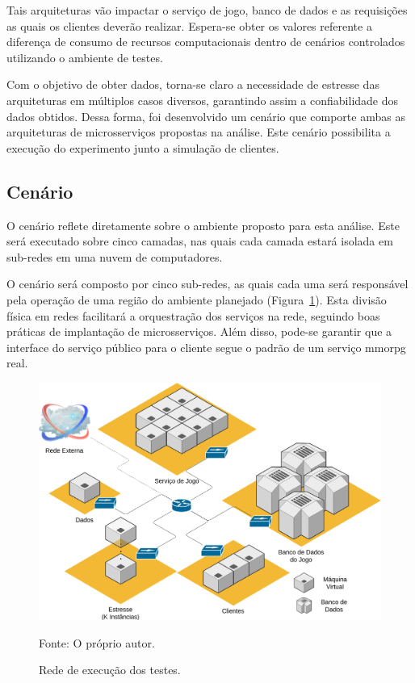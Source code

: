 Tais arquiteturas vão impactar o serviço de jogo, banco de dados e as requisições as quais os clientes deverão realizar.
%
Espera-se obter os valores referente a diferença de consumo de recursos computacionais dentro de cenários controlados utilizando o ambiente de testes.



Com o objetivo de obter dados, torna-se claro a necessidade de estresse das arquiteturas em múltiplos casos diversos, garantindo assim a confiabilidade dos dados obtidos.
%
Dessa forma, foi desenvolvido um cenário que comporte ambas as arquiteturas de microsserviços propostas na análise.
%
Este cenário possibilita a execução do experimento junto a simulação de clientes.



\subsection{Cenário}



O cenário reflete diretamente sobre o ambiente proposto para esta análise.
%
Este será executado sobre cinco camadas, nas quais cada camada estará isolada em sub-redes em uma nuvem de computadores.

O cenário será composto por cinco sub-redes, as quais cada uma será responsável pela operação de uma região do ambiente planejado (Figura~\ref{fig:cenario}).
%
Esta divisão física em redes facilitará a orquestração dos serviços na rede, seguindo boas práticas de implantação de microsserviços.
%
Além disso, pode-se garantir que a interface do serviço público para o cliente segue o padrão de um serviço \ac{mmorpg} real.

\begin{figure}[htb!]
  \caption{Rede de execução dos testes.}
  \label{fig:cenario}
  \includegraphics[width=\textwidth]{img/cap3/cenario.png}
  \centering

  Fonte: O próprio autor.
\end{figure}

